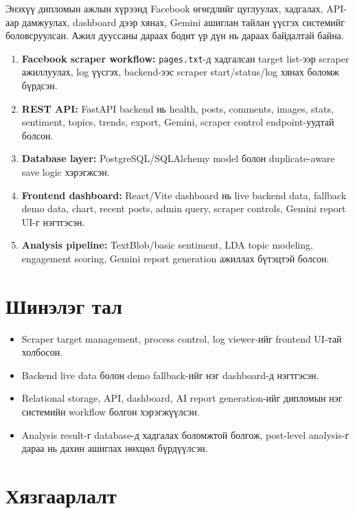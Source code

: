 \documentclass[
12pt,
oneside,
english,
onehalfspacing,
nolistspacing,
headsepline,
]{MUST-Thesis}
\begin{document}
Энэхүү дипломын ажлын хүрээнд Facebook өгөгдлийг цуглуулах, хадгалах, API-аар дамжуулах, dashboard дээр хянах, Gemini ашиглан тайлан үүсгэх системийг боловсруулсан. Ажил дууссаны дараах бодит үр дүн нь дараах байдалтай байна.

\begin{enumerate}
    \item \textbf{Facebook scraper workflow:} \texttt{pages.txt}-д хадгалсан target list-ээр scraper ажиллуулах, log үүсгэх, backend-ээс scraper start/status/log хянах боломж бүрдсэн.
    \item \textbf{REST API:} FastAPI backend нь health, posts, comments, images, stats, sentiment, topics, trends, export, Gemini, scraper control endpoint-уудтай болсон.
    \item \textbf{Database layer:} PostgreSQL/SQLAlchemy model болон duplicate-aware save logic хэрэгжсэн.
    \item \textbf{Frontend dashboard:} React/Vite dashboard нь live backend data, fallback demo data, chart, recent posts, admin query, scraper controls, Gemini report UI-г нэгтгэсэн.
    \item \textbf{Analysis pipeline:} TextBlob/basic sentiment, LDA topic modeling, engagement scoring, Gemini report generation ажиллах бүтэцтэй болсон.
\end{enumerate}

\section{Шинэлэг тал}

\begin{itemize}
    \item Scraper target management, process control, log viewer-ийг frontend UI-тай холбосон.
    \item Backend live data болон demo fallback-ийг нэг dashboard-д нэгтгэсэн.
    \item Relational storage, API, dashboard, AI report generation-ийг дипломын нэг системийн workflow болгон хэрэгжүүлсэн.
    \item Analysis result-г database-д хадгалах боломжтой болгож, post-level analysis-г дараа нь дахин ашиглах нөхцөл бүрдүүлсэн.
\end{itemize}

\section{Хязгаарлалт}
\end{document}
